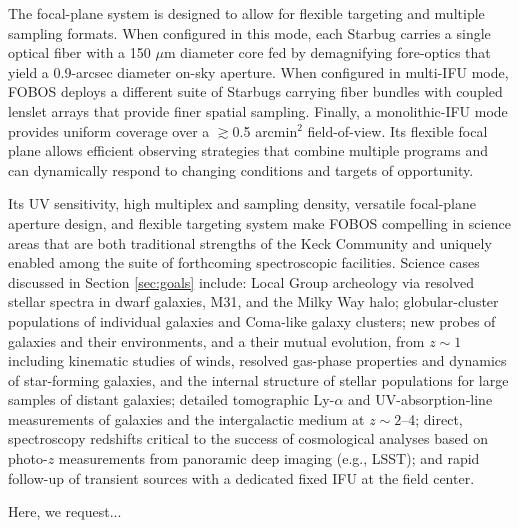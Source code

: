 The focal-plane system is designed to allow for flexible targeting
and multiple sampling formats. When configured in this mode, each
Starbug carries a single optical fiber with a 150 $\mu$m diameter
core fed by demagnifying fore-optics that yield a 0.9-arcsec diameter
on-sky aperture. When configured in multi-IFU mode, FOBOS deploys a
different suite of Starbugs carrying fiber bundles with coupled
lenslet arrays that provide finer spatial sampling. Finally, a
monolithic-IFU mode provides uniform coverage over a $\gtrsim$0.5
arcmin$^2$ field-of-view. Its flexible focal plane allows efficient
observing strategies that combine multiple programs and can
dynamically respond to changing conditions and targets of
opportunity.

Its UV sensitivity, high multiplex and sampling density, versatile
focal-plane aperture design, and flexible targeting system make FOBOS
compelling in science areas that are both traditional strengths of
the Keck Community and uniquely enabled among the suite of
forthcoming spectroscopic facilities. Science cases discussed in
Section \ref{sec:goals} include: Local Group archeology via resolved
stellar spectra in dwarf galaxies, M31, and the Milky Way halo;
globular-cluster populations of individual galaxies and Coma-like
galaxy clusters; new probes of galaxies and their environments, and a
their mutual evolution, from $z \sim 1$ including kinematic studies
of winds, resolved gas-phase properties and dynamics of star-forming
galaxies, and the internal structure of stellar populations for large
samples of distant galaxies; detailed tomographic Ly-$\alpha$ and
UV-absorption-line measurements of galaxies and the intergalactic
medium at $z \sim 2$--4; direct, spectroscopy redshifts critical to
the success of cosmological analyses based on photo-$z$ measurements
from panoramic deep imaging (e.g., LSST); and rapid follow-up of
transient sources with a dedicated fixed IFU at the field center.

Here, we request...


